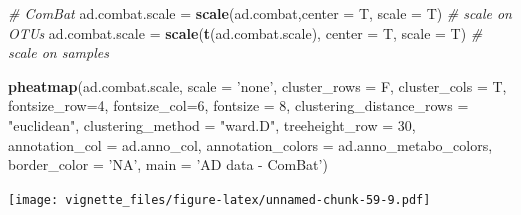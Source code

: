 \documentclass[]{book}
\newenvironment{Shaded}{\begin{snugshade}}{\end{snugshade}}
\newcommand{\KeywordTok}[1]{\textcolor[rgb]{0.13,0.29,0.53}{\textbf{#1}}}
\newcommand{\DataTypeTok}[1]{\textcolor[rgb]{0.13,0.29,0.53}{#1}}
\newcommand{\DecValTok}[1]{\textcolor[rgb]{0.00,0.00,0.81}{#1}}
\newcommand{\StringTok}[1]{\textcolor[rgb]{0.31,0.60,0.02}{#1}}
\newcommand{\CommentTok}[1]{\textcolor[rgb]{0.56,0.35,0.01}{\textit{#1}}}
\newcommand{\NormalTok}[1]{#1}
\begin{document}
\begin{Shaded}
\begin{Highlighting}[]
\CommentTok{# ComBat}
\NormalTok{ad.combat.scale =}\StringTok{ }\KeywordTok{scale}\NormalTok{(ad.combat,}\DataTypeTok{center =}\NormalTok{ T, }\DataTypeTok{scale =}\NormalTok{ T) }\CommentTok{# scale on OTUs}
\NormalTok{ad.combat.scale =}\StringTok{ }\KeywordTok{scale}\NormalTok{(}\KeywordTok{t}\NormalTok{(ad.combat.scale), }\DataTypeTok{center =}\NormalTok{ T, }\DataTypeTok{scale =}\NormalTok{ T) }\CommentTok{# scale on samples}

\KeywordTok{pheatmap}\NormalTok{(ad.combat.scale, }
         \DataTypeTok{scale =} \StringTok{'none'}\NormalTok{, }
         \DataTypeTok{cluster_rows =}\NormalTok{ F, }
         \DataTypeTok{cluster_cols =}\NormalTok{ T, }
         \DataTypeTok{fontsize_row=}\DecValTok{4}\NormalTok{, }\DataTypeTok{fontsize_col=}\DecValTok{6}\NormalTok{,}
         \DataTypeTok{fontsize =} \DecValTok{8}\NormalTok{,}
         \DataTypeTok{clustering_distance_rows =} \StringTok{"euclidean"}\NormalTok{,}
         \DataTypeTok{clustering_method =} \StringTok{"ward.D"}\NormalTok{,}
         \DataTypeTok{treeheight_row =} \DecValTok{30}\NormalTok{,}
         \DataTypeTok{annotation_col =}\NormalTok{ ad.anno_col,}
         \DataTypeTok{annotation_colors =}\NormalTok{ ad.anno_metabo_colors,}
         \DataTypeTok{border_color =} \StringTok{'NA'}\NormalTok{,}
         \DataTypeTok{main =} \StringTok{'AD data - ComBat'}\NormalTok{)}
\end{Highlighting}
\end{Shaded}

\texttt{[image: vignette\_files/figure-latex/unnamed-chunk-59-9.pdf]}
\end{document}
